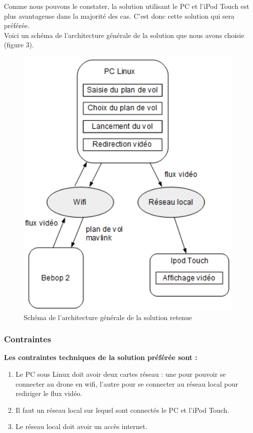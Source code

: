 \documentclass{article}
\begin{document}
        \indent Comme nous pouvons le constater, la solution utilisant le PC et l'iPod Touch est plus avantageuse dans la majorité des cas. C'est donc cette solution qui sera préférée.\\
        
        \indent Voici un schéma de l'architecture générale de la solution que nous avons choisie (figure 3).   
 		\begin{figure}[!ht]
 		\begin{center}
 		\includegraphics[scale=0.7]{Solution_PC.PNG}
 		\caption{Schéma de l'architecture générale de la solution retenue}
 		\end{center}
		\end{figure}
\newpage
\subsubsection{Contraintes}

	\begin{flushleft}
	\textbf{Les contraintes techniques de la solution préférée sont :}
	\end{flushleft}
		\begin{enumerate}
        \item Le PC sous Linux doit avoir deux cartes réseau : une pour pouvoir se connecter au drone en wifi, l'autre pour se connecter au réseau local pour rediriger le flux vidéo.
        \item Il faut un réseau local sur lequel sont connectés le PC et l'iPod Touch.
        \item Le réseau local doit avoir un accès internet.
        \end{enumerate}
	
\end{document}
